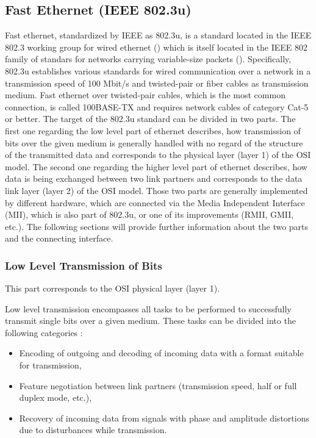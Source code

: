 \subsection{Fast Ethernet (IEEE 802.3u)}
Fast ethernet, standardized by IEEE as 802.3u, is a standard located in the IEEE 802.3 working group for wired ethernet (\cite{ieee:802.3}) which is itself located in the IEEE 802 family of standars for networks carrying variable-size packets (\cite{wikipedia.org:ieee_802}). Specifically, 802.3u establishes various standards for wired communication over a network in a transmission speed of 100 Mbit/s and twisted-pair or fiber cables as transmission medium. Fast ethernet over twisted-pair cables, which is the most common connection, is called 100BASE-TX and requires network cables of category Cat-5 or better.
The target of the 802.3u standard can be divided in two parts. The first one regarding the low level part of ethernet describes, how transmission of bits over the given medium is generally handled with no regard of the structure of the transmitted data and corresponds to the physical layer (layer 1) of the OSI model. The second one regarding the higher level part of ethernet describes, how data is being exchanged between two link partners and corresponds to the data link layer (layer 2) of the OSI model. Those two parts are generally implemented by different hardware, which are connected via the Media Independent Interface (MII), which is also part of 802.3u, or one of its improvements (RMII, GMII, etc.). The following sections will provide further information about the two parts and the connecting interface.

\subsubsection{Low Level Transmission of Bits}
This part corresponds to the OSI physical layer (layer 1).

Low level transmission encompasses all tasks to be performed to successfully transmit single bits over a given medium. These tasks can be divided into the following categories \cite{smsc:lan8720a}:
\begin{itemize}
  \item Encoding of outgoing and decoding of incoming data with a format suitable for transmission,
  \item Feature negotiation between link partners (transmission speed, half or full duplex mode, etc.),
  \item Recovery of incoming data from signals with phase and amplitude distortions due to disturbances while transmission.
\end{itemize}

